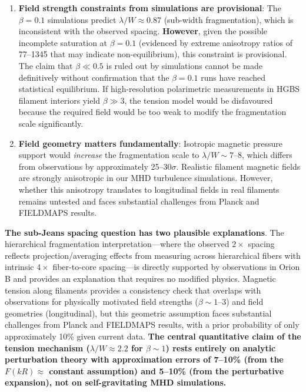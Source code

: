 \documentclass[11pt,a4paper]{article}
\begin{document}
\begin{enumerate}
    \item \textbf{Field strength constraints from simulations are provisional}: The $\beta = 0.1$ simulations predict $\lambda/W \approx 0.87$ (sub-width fragmentation), which is inconsistent with the observed spacing. \textbf{However}, given the possible incomplete saturation at $\beta = 0.1$ (evidenced by extreme anisotropy ratios of 77--1345 that may indicate non-equilibrium), this constraint is provisional. The claim that $\beta \ll 0.5$ is ruled out by simulations cannot be made definitively without confirmation that the $\beta = 0.1$ runs have reached statistical equilibrium. If high-resolution polarimetric measurements in HGBS filament interiors yield $\beta \gg 3$, the tension model would be disfavoured because the required field would be too weak to modify the fragmentation scale significantly.

    \item \textbf{Field geometry matters fundamentally}: Isotropic magnetic pressure support would \textit{increase} the fragmentation scale to $\lambda/W \sim 7$--$8$, which differs from observations by approximately 25--$30\sigma$. Realistic filament magnetic fields are strongly anisotropic in our MHD turbulence simulations. However, whether this anisotropy translates to longitudinal fields in real filaments remains untested and faces substantial challenges from Planck and FIELDMAPS results.
\end{enumerate}

\textbf{The sub-Jeans spacing question has two plausible explanations}. The hierarchical fragmentation interpretation—where the observed $2\times$ spacing reflects projection/averaging effects from measuring across hierarchical fibers with intrinsic $4\times$ fiber-to-core spacing—is directly supported by observations in Orion B \citep{Yang2024} and provides an explanation that requires no modified physics. Magnetic tension along filaments provides a consistency check that overlaps with observations for physically motivated field strengths ($\beta \sim 1$--$3$) and field geometries (longitudinal), but this geometric assumption faces substantial challenges from Planck and FIELDMAPS results, with a prior probability of only approximately 10\% given current data. \textbf{The central quantitative claim of the tension mechanism ($\lambda/W \approx 2.2$ for $\beta \sim 1$) rests entirely on analytic perturbation theory with approximation errors of 7--10\% (from the $F(kR) \approx$ constant assumption) and 5--10\% (from the perturbative expansion), not on self-gravitating MHD simulations.}
\end{document}
